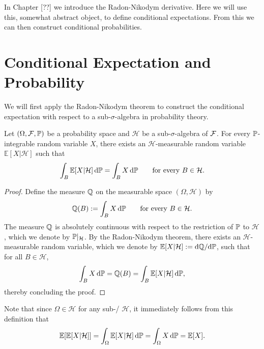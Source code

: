 
In Chapter [??] we introduce the Radon-Nikodym derivative. Here we will use this, somewhat abstract object, to define conditional expectations. From this we can then construct conditional probabilities. 


\section{Conditional Expectation and Probability}

We will first apply the Radon-Nikodym theorem to construct the conditional expectation with respect to a sub-$\sigma$-algebra in probability theory.

\begin{theorem}
Let $(\Omega, \mathcal F, \mathbb P)$ be a probability space and $\mathcal{H}$ be a sub-$\sigma$-algebra of $\mathcal F$. For every $\mathbb P$-integrable random variable $X$, there exists an $\mathcal{H}$-measurable random variable $\mathbb{E}[X|\mathcal{H}]$ such that
\[
\int_B \mathbb{E}[ X | \mathcal{H} ] \,\mathrm{d} \mathbb P = \int_B X\, \mathrm{d} \mathbb P\qquad\text{for every $B \in \mathcal{H}$}.
\]
\end{theorem}

\begin{proof}
Define the measure $\mathbb Q$ on the measurable space $(\Omega,\mathcal{H})$ by
\[
\mathbb Q(B) := \int_B X\, \mathrm{d} \mathbb P \qquad \text{for every  $B \in \mathcal{H}$}.
\]
The measure $\mathbb Q$ is absolutely continuous with respect to the restriction of $\mathbb P$ to $\mathcal{H}$, which we denote by $\mathbb P|_{\mathcal{H}}$.
By the Radon-Nikodym theorem, there exists an $\mathcal{H}$-measurable random variable, which we denote by $\mathbb{E}[X|\mathcal{H}] := \mathrm{d}\mathbb Q/\mathrm{d}\mathbb P$, such that for all $B \in \mathcal{H}$,
\[
\int_B X \,\mathrm{d} \mathbb P = \mathbb Q(B) = \int_B \mathbb{E}[X | \mathcal{H}] \,\mathrm{d} \mathbb P,
\]
thereby concluding the proof.
\end{proof}

Note that since $\Omega \in \mathcal{H}$ for any sub-\sigalg/ $\mathcal{H}$, it immediately follows from this definition that
\begin{equation}\label{eq:law_total_expectation}
	\mathbb E[\mathbb E[X|\mathcal{H}]] = \int_\Omega \mathbb E[X|\mathcal{H}] \, \mathrm{d} \mathbb P = \int_\Omega X \, \mathrm{d} \mathbb P = \mathbb E[X].
\end{equation}

